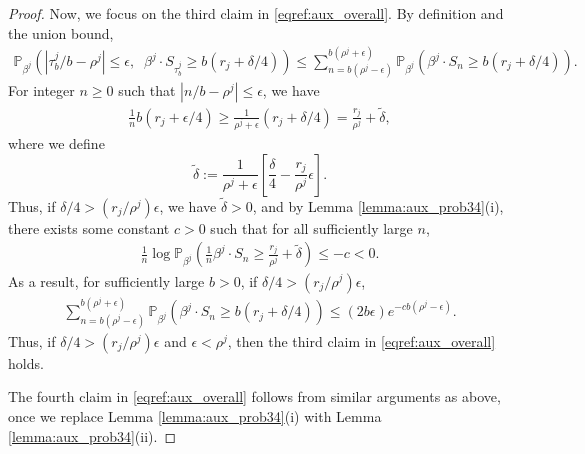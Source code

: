 \documentclass[10pt,a4paper]{amsart}
\newcommand{\Pro}{{\mathbb{P}}}
\begin{document}
\begin{proof}
Now, we focus on the third claim in \eqref{eqref:aux_overall}. By definition and the union bound,
\begin{align*}
 \Pro_{\beta^j}\left(\left|{\tau_b^j}/{b} - \rho^{j}\right| \leq   \epsilon, \;\; \beta^j \cdot S_{\tau_b^j} \geq  b(r_j + \delta/4) \right) 
 \leq \sum_{n = b(\rho^j-\epsilon)}^{b(\rho^j+\epsilon)}  \Pro_{\beta^j}\left(\beta^j \cdot S_{n} \geq  b(r_j + \delta/4) \right).
\end{align*}
For integer $n \geq 0$ such that $|n/b - \rho^j| \leq \epsilon$, we have
\begin{align*}
    \frac{1}{n}  b(r_j + \epsilon/4) \geq \frac{1}{\rho^j +\epsilon} (r_j + \delta/4) = \frac{r_j}{\rho^j} + \tilde{\delta},
\end{align*}
where we define
$$
\tilde{\delta}:= \frac{1}{\rho^j + \epsilon}\left[\frac{\delta}{4} - \frac{r_j}{\rho^j} \epsilon \right].
$$
Thus, if $\delta/4 >  ({r_j}/{\rho^j}) \epsilon $, we have $\tilde{\delta} > 0$, and by Lemma \ref{lemma:aux_prob34}(i), there exists some constant $c > 0$ such that  for all sufficiently large $n$, 
\begin{align*}
           \frac{1}{n}  \log \Pro_{\beta^j}\left( \frac{1}{n}\beta^j \cdot S_n \geq \frac{r_j}{\rho^j} + \tilde{\delta}  \right) \leq -c < 0.
    \end{align*}
As a result, for sufficiently large $b > 0$, if $\delta/4 >  ({r_j}/{\rho^j}) \epsilon $,
\begin{align*}
    \sum_{n = b(\rho^j-\epsilon)}^{b(\rho^j+\epsilon)}  \Pro_{\beta^j}\left(\beta^j \cdot S_{n} \geq  b(r_j + \delta/4) \right) \leq (2b\epsilon) e^{-c b(\rho^j - \epsilon)}.
\end{align*}
Thus, if $\delta/4 >  ({r_j}/{\rho^j}) \epsilon $ and $\epsilon < \rho^j$, then the third claim in \eqref{eqref:aux_overall} holds.

The fourth claim in \eqref{eqref:aux_overall} follows from similar arguments as above, once we replace   Lemma \ref{lemma:aux_prob34}(i) with Lemma \ref{lemma:aux_prob34}(ii).
\end{proof}
\end{document}

